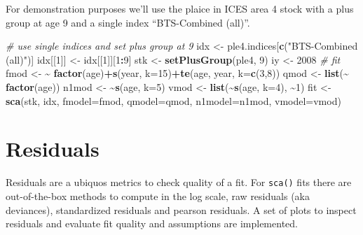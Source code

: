 \documentclass[
]{book}
\newenvironment{Shaded}{\begin{snugshade}}{\end{snugshade}}
\newcommand{\AttributeTok}[1]{\textcolor[rgb]{0.13,0.29,0.53}{#1}}
\newcommand{\CommentTok}[1]{\textcolor[rgb]{0.56,0.35,0.01}{\textit{#1}}}
\newcommand{\DecValTok}[1]{\textcolor[rgb]{0.00,0.00,0.81}{#1}}
\newcommand{\ErrorTok}[1]{\textcolor[rgb]{0.64,0.00,0.00}{\textbf{#1}}}
\newcommand{\FunctionTok}[1]{\textcolor[rgb]{0.13,0.29,0.53}{\textbf{#1}}}
\newcommand{\NormalTok}[1]{#1}
\newcommand{\OtherTok}[1]{\textcolor[rgb]{0.56,0.35,0.01}{#1}}
\newcommand{\SpecialCharTok}[1]{\textcolor[rgb]{0.81,0.36,0.00}{\textbf{#1}}}
\newcommand{\StringTok}[1]{\textcolor[rgb]{0.31,0.60,0.02}{#1}}
\begin{document}
For demonstration purposes we'll use the plaice in ICES area 4 stock with a plus group at age 9 and a single index ``BTS-Combined (all)''.

\begin{Shaded}
\begin{Highlighting}[]
\CommentTok{\# use single indices and set plus group at 9}
\NormalTok{idx }\OtherTok{\textless{}{-}}\NormalTok{ ple4.indices[}\FunctionTok{c}\NormalTok{(}\StringTok{"BTS{-}Combined (all)"}\NormalTok{)]}
\NormalTok{idx[[}\DecValTok{1}\NormalTok{]] }\OtherTok{\textless{}{-}}\NormalTok{ idx[[}\DecValTok{1}\NormalTok{]][}\DecValTok{1}\SpecialCharTok{:}\DecValTok{9}\NormalTok{]}
\NormalTok{stk }\OtherTok{\textless{}{-}} \FunctionTok{setPlusGroup}\NormalTok{(ple4, }\DecValTok{9}\NormalTok{)}
\NormalTok{iy }\OtherTok{\textless{}{-}} \DecValTok{2008}
\CommentTok{\# fit}
\NormalTok{fmod }\OtherTok{\textless{}{-}} \ErrorTok{\textasciitilde{}} \FunctionTok{factor}\NormalTok{(age)}\SpecialCharTok{+}\FunctionTok{s}\NormalTok{(year, }\AttributeTok{k=}\DecValTok{15}\NormalTok{)}\SpecialCharTok{+}\FunctionTok{te}\NormalTok{(age, year, }\AttributeTok{k=}\FunctionTok{c}\NormalTok{(}\DecValTok{3}\NormalTok{,}\DecValTok{8}\NormalTok{))}
\NormalTok{qmod }\OtherTok{\textless{}{-}} \FunctionTok{list}\NormalTok{(}\SpecialCharTok{\textasciitilde{}} \FunctionTok{factor}\NormalTok{(age))}
\NormalTok{n1mod }\OtherTok{\textless{}{-}} \ErrorTok{\textasciitilde{}}\FunctionTok{s}\NormalTok{(age, }\AttributeTok{k=}\DecValTok{5}\NormalTok{)}
\NormalTok{vmod }\OtherTok{\textless{}{-}} \FunctionTok{list}\NormalTok{(}\SpecialCharTok{\textasciitilde{}}\FunctionTok{s}\NormalTok{(age, }\AttributeTok{k=}\DecValTok{4}\NormalTok{), }\SpecialCharTok{\textasciitilde{}}\DecValTok{1}\NormalTok{)}
\NormalTok{fit }\OtherTok{\textless{}{-}} \FunctionTok{sca}\NormalTok{(stk, idx, }\AttributeTok{fmodel=}\NormalTok{fmod, }\AttributeTok{qmodel=}\NormalTok{qmod, }\AttributeTok{n1model=}\NormalTok{n1mod, }\AttributeTok{vmodel=}\NormalTok{vmod)}
\end{Highlighting}
\end{Shaded}

\hypertarget{residuals}{%
\section{Residuals}\label{residuals}}

Residuals are a ubiquos metrics to check quality of a fit. For \texttt{sca()} fits there are out-of-the-box methods to compute in the log scale, raw residuals (aka deviances), standardized residuals and pearson residuals. A set of plots to inspect residuals and evaluate fit quality and assumptions are implemented.
\end{document}
